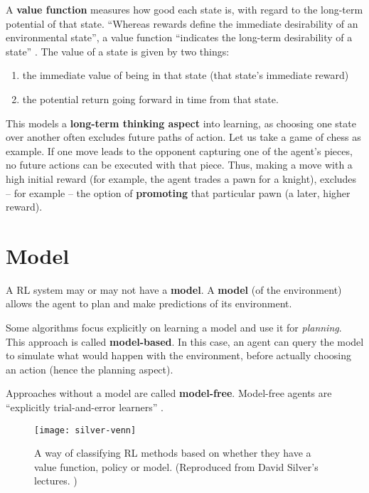 A \textbf{value function} measures how good each state is, with regard to the long-term potential of that state.
``Whereas rewards define the immediate desirability of an environmental state'', a value function ``indicates the long-term desirability of a state'' \cite{rlai}.
The value of a state is given by two things:
\begin{enumerate}
    \item the immediate value of being in that state (that state’s immediate reward)
    \item the potential return going forward in time from that state.
\end{enumerate}

This models a \textbf{long-term thinking aspect} into learning, as choosing one state over another often excludes future paths of action.
Let us take a game of chess as example.
If one move leads to the opponent capturing one of the agent's pieces, no future actions can be executed with that piece.
Thus, making a move with a high initial reward (for example, the agent trades a pawn for a knight), excludes -- for example -- the option of \textbf{promoting} that particular pawn (a later, higher reward).

\section{Model}
A RL system may or may not have a \textbf{model}.
A \textbf{model} (of the environment) allows the agent to plan and make predictions of its environment.

Some algorithms focus explicitly on learning a model and use it for \emph{planning}.
This approach is called \textbf{model-based}.
In this case, an agent can query the model to simulate what would happen with the environment, before actually choosing an action (hence the planning aspect).

Approaches without a model are called \textbf{model-free}.
Model-free agents are ``explicitly trial-and-error learners'' \cite{rlai}.

\begin{figure}[ht]
    \caption{A way of classifying RL methods based on whether they have a value function, policy or model. (Reproduced from David Silver's lectures. \cite{silver-lectures})}
    \vspace*{0.2cm}
    \centering
    \texttt{[image: silver-venn]}
\end{figure}
